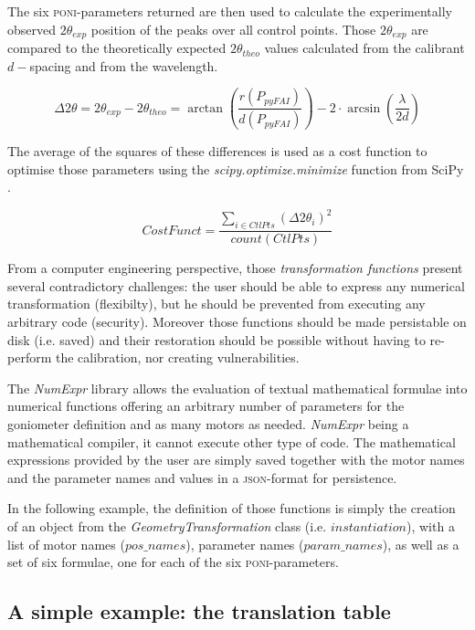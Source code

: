 \documentclass[preprint]{iucr}              %
\begin{document}
The six \textsc{poni}-parameters returned 
are then used to
calculate the experimentally observed $2\theta_{exp}$ position of the peaks over all control
points.
Those $2\theta_{exp}$ are compared to
the theoretically expected $2\theta_{theo}$ values calculated from the calibrant $d-$spacing and
from the wavelength.

\begin{equation}
\Delta 2\theta = 2\theta _{exp} - 2\theta _{theo} =
\arctan(\frac{r(P_{pyFAI})}{d(P_{pyFAI})}) -  2 \cdot
\arcsin(\frac{\lambda}{2d})
\end{equation}


The average of the squares of these differences is used as a cost function
to optimise those parameters using the \textit{scipy.optimize.minimize}
function from SciPy \cite{scipy}.

\begin{equation}
CostFunct = \frac{ \sum\limits_{i \in CtlPts} {(\Delta 2\theta_i)^2}}
{count(CtlPts)} 
\end{equation}

From a computer engineering perspective, 
those \textit{transformation functions} present several contradictory challenges: 
the user should be able to express any numerical transformation (flexibilty),
but he should be prevented from executing any arbitrary code (security).  
Moreover those functions should be made persistable on disk (i.e. saved) and 
their restoration should be possible without having to re-perform the calibration, nor 
creating vulnerabilities. 

The \textit{NumExpr} library \cite{numexpr} allows the evaluation of 
textual mathematical formulae into numerical
functions offering an arbitrary number of parameters for 
the goniometer definition and as many motors as needed.
\textit{NumExpr} being a mathematical compiler, it cannot execute other type of code. 
The mathematical expressions provided by the user are simply saved together with the motor names 
and the parameter names and values in a \textsc{json}-format for persistence.

In the following example, the definition of those functions is simply the creation 
of an object from the 
\textit{GeometryTransformation} class (i.e. $instantiation$), with a list of
motor names ($pos\_names$), parameter names ($param\_names$), as well as a set of six formulae, 
one for each of the six \textsc{poni}-parameters.

\subsection{A simple example: the translation table}
\end{document}
